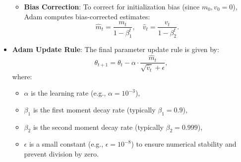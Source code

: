 \documentclass[12pt]{article}
\theoremstyle{definition}
\begin{document}
\begin{itemize}
\begin{itemize}
        \item \textbf{Bias Correction}: To correct for initialization bias (since $m_0, v_0 = 0$), Adam computes bias-corrected estimates:
        \[
        \hat{m}_t = \frac{m_t}{1 - \beta_1^t}, \quad \hat{v}_t = \frac{v_t}{1 - \beta_2^t}.
        \]
    \end{itemize}

    \item \textbf{Adam Update Rule}: The final parameter update rule is given by:
    \[
    \theta_{t+1} = \theta_t - \alpha \cdot \frac{\hat{m}_t}{\sqrt{\hat{v}_t} + \epsilon},
    \]
    where:
    \begin{itemize}
        \item $\alpha$ is the learning rate (e.g., $\alpha = 10^{-3}$),
        \item $\beta_1$ is the first moment decay rate (typically $\beta_1 = 0.9$),
        \item $\beta_2$ is the second moment decay rate (typically $\beta_2 = 0.999$),
        \item $\epsilon$ is a small constant (e.g., $\epsilon = 10^{-8}$) to ensure numerical stability and prevent division by zero.
    \end{itemize}

\end{itemize}

\newpage






\end{document}
